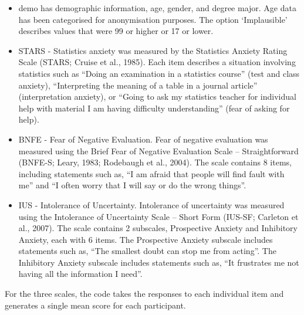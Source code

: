\documentclass[
  oneside]{book}
\begin{document}
\begin{itemize}
\item
  demo has demographic information, age, gender, and degree major. Age data has been categorised for anonymisation purposes. The option `Implausible' describes values that were 99 or higher or 17 or lower.
\item
  STARS - Statistics anxiety was measured by the Statistics Anxiety Rating Scale (STARS; Cruise et al., 1985). Each item describes a situation involving statistics such as ``Doing an examination in a statistics course'' (test and class anxiety), ``Interpreting the meaning of a table in a journal article'' (interpretation anxiety), or ``Going to ask my statistics teacher for individual help with material I am having difficulty understanding'' (fear of asking for help).
\item
  BNFE - Fear of Negative Evaluation. Fear of negative evaluation was measured using the Brief Fear of Negative Evaluation Scale -- Straightforward (BNFE-S; Leary, 1983; Rodebaugh et al., 2004). The scale contains 8 items, including statements such as, ``I am afraid that people will find fault with me'' and ``I often worry that I will say or do the wrong things''.
\item
  IUS - Intolerance of Uncertainty. Intolerance of uncertainty was measured using the Intolerance of Uncertainty Scale -- Short Form (IUS-SF; Carleton et al., 2007). The scale contains 2 subscales, Prospective Anxiety and Inhibitory Anxiety, each with 6 items. The Prospective Anxiety subscale includes statements such as, ``The smallest doubt can stop me from acting''. The Inhibitory Anxiety subscale includes statements such as, ``It frustrates me not having all the information I need''.
\end{itemize}

For the three scales, the code takes the responses to each individual item and generates a single mean score for each participant.
\end{document}
